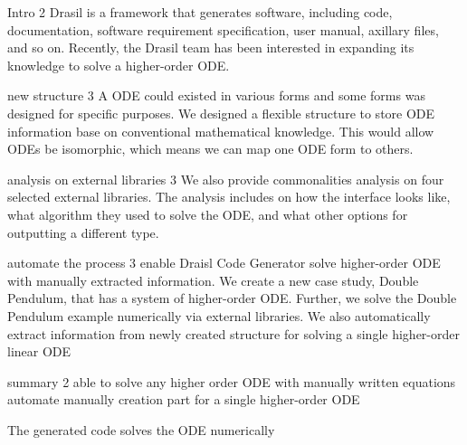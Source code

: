 Intro 2
Drasil is a framework that generates software, including code, documentation, software requirement specification, user manual, axillary files, and so on. Recently, the Drasil team has been interested in expanding its knowledge to solve a higher-order ODE.

new structure 3 
A ODE could existed in various forms and some forms was designed for specific purposes. We designed a flexible structure to store ODE information base on conventional mathematical knowledge. This would allow ODEs be isomorphic, which means we can map one ODE form to others.

analysis on external libraries 3 
We also provide commonalities analysis on four selected external libraries. The analysis includes on how the interface looks like, what algorithm they used to solve the ODE, and what other options for outputting a different type.

automate the process 3
enable Draisl Code Generator solve higher-order ODE with manually extracted information. We create a new case study, Double Pendulum, that has a system of higher-order ODE. Further, we solve the Double Pendulum example numerically via external libraries. We also automatically extract information from newly created structure for solving a single higher-order linear ODE

summary 2
able to solve any higher order ODE with manually written equations
automate manually creation part for a single higher-order ODE

The generated code solves the ODE numerically